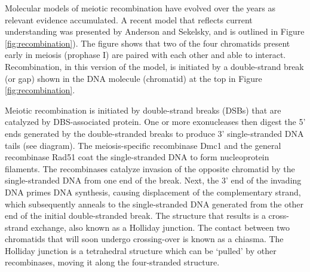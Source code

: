 Molecular models of meiotic recombination have evolved over the years as relevant evidence accumulated. A recent model that reflects current understanding was presented by Anderson and Sekelsky, and is outlined in Figure \ref{fig:recombination}). The figure shows that two of the four chromatids present early in meiosis (prophase I) are paired with each other and able to interact. Recombination, in this version of the model, is initiated by a double-strand break (or gap) shown in the DNA molecule (chromatid) at the top in Figure \ref{fig:recombination}.

Meiotic recombination is initiated by double-strand breaks (DSBs) that are catalyzed by DBS-associated protein. One or more exonucleases then digest the 5' ends generated by the double-stranded breaks to produce 3' single-stranded DNA tails (see diagram). The meiosis-specific recombinase Dmc1 and the general recombinase Rad51 coat the single-stranded DNA to form nucleoprotein filaments. The recombinases catalyze invasion of the opposite chromatid by the single-stranded DNA from one end of the break. Next, the 3' end of the invading DNA primes DNA synthesis, causing displacement of the complementary strand, which subsequently anneals to the single-stranded DNA generated from the other end of the initial double-stranded break. The structure that results is a cross-strand exchange, also known as a Holliday junction. The contact between two chromatids that will soon undergo crossing-over is known as a chiasma. The Holliday junction is a tetrahedral structure which can be `pulled' by other recombinases, moving it along the four-stranded structure.



